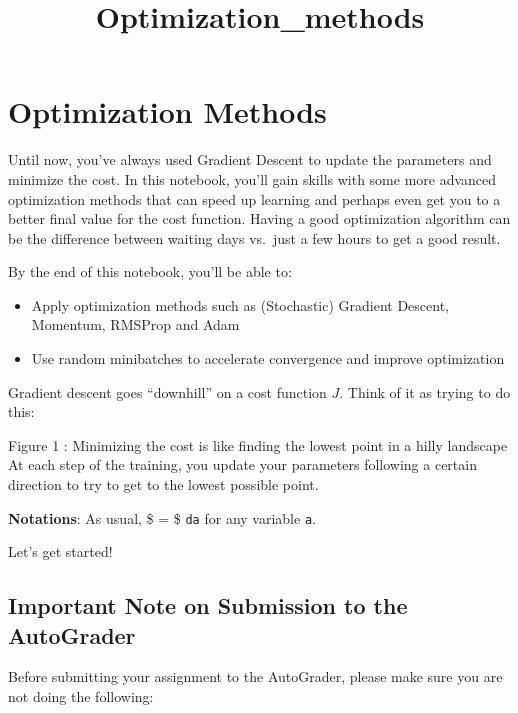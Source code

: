 \documentclass[11pt]{article}
\title{Optimization\_methods}
\providecommand{\tightlist}{%
      \setlength{\itemsep}{0pt}\setlength{\parskip}{0pt}}
\begin{document}
    
    \maketitle
    
    

    
    \hypertarget{optimization-methods}{%
\section{Optimization Methods}\label{optimization-methods}}

Until now, you've always used Gradient Descent to update the parameters
and minimize the cost. In this notebook, you'll gain skills with some
more advanced optimization methods that can speed up learning and
perhaps even get you to a better final value for the cost function.
Having a good optimization algorithm can be the difference between
waiting days vs.~just a few hours to get a good result.

By the end of this notebook, you'll be able to:

\begin{itemize}
\tightlist
\item
  Apply optimization methods such as (Stochastic) Gradient Descent,
  Momentum, RMSProp and Adam
\item
  Use random minibatches to accelerate convergence and improve
  optimization
\end{itemize}

Gradient descent goes ``downhill'' on a cost function \(J\). Think of it
as trying to do this:

Figure 1 : Minimizing the cost is like finding the lowest point in a
hilly landscape At each step of the training, you update your parameters
following a certain direction to try to get to the lowest possible
point.

\textbf{Notations}: As usual, \$ = \$
\texttt{da} for any variable \texttt{a}.

Let's get started!

\hypertarget{important-note-on-submission-to-the-autograder}{%
\subsection{Important Note on Submission to the
AutoGrader}\label{important-note-on-submission-to-the-autograder}}

Before submitting your assignment to the AutoGrader, please make sure
you are not doing the following:
\end{document}
